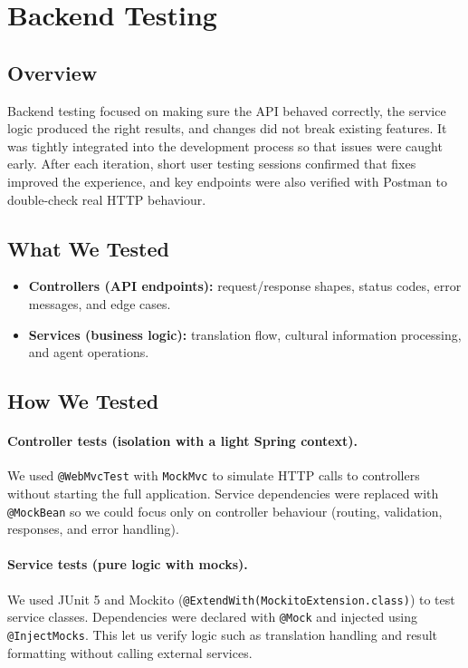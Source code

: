\section{Backend Testing}
\label{sec:be-testing}

\subsection{Overview}
Backend testing focused on making sure the API behaved correctly, the service logic produced the right results, and changes did not break existing features. 
It was tightly integrated into the development process so that issues were caught early. 
After each iteration, short user testing sessions confirmed that fixes improved the experience, and key endpoints were also verified with Postman to double-check real HTTP behaviour.


\subsection{What We Tested}
\begin{itemize}
    \item \textbf{Controllers (API endpoints):} request/response shapes, status codes, error messages, and edge cases.
    \item \textbf{Services (business logic):} translation flow, cultural information processing, and agent operations.
\end{itemize}

\subsection{How We Tested}
\paragraph{Controller tests (isolation with a light Spring context).}
We used \texttt{@WebMvcTest} with \texttt{MockMvc} to simulate HTTP calls to controllers without starting the full application. Service dependencies were replaced with \texttt{@MockBean} so we could focus only on controller behaviour (routing, validation, responses, and error handling).

\paragraph{Service tests (pure logic with mocks).}
We used JUnit 5 and Mockito (\texttt{@ExtendWith(MockitoExtension.class)}) to test service classes. Dependencies were declared with \texttt{@Mock} and injected using \texttt{@InjectMocks}. This let us verify logic such as translation handling and result formatting without calling external services.

